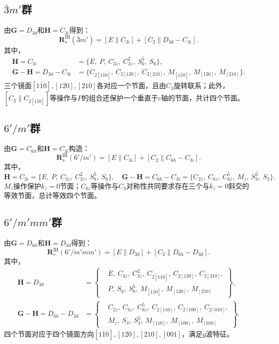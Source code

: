 \subsection*{$\bar{3}m'$群}
由$\mathbf{G}=D_{3d}$和$\mathbf{H}=C_{3i}$得到：
\[
\mathbf{R}_s^{\mathrm{III}}(\bar{3}m') = [E\|C_{3i}] + [C_2\|D_{3d}-C_{3i}].
\]
其中，
\[
\begin{aligned}
\mathbf{H}=C_{3i} &= \{E,\ P,\ C_{3z},\ C_{3z}^2,\ S_6^5,\ S_6\},\\
\mathbf{G}-\mathbf{H}=D_{3d}-C_{3i} &= \{C_{2[1\bar10]},\ C_{2[120]},\ C_{2[210]},\ M_{[1\bar10]},\ M_{[120]},\ M_{[210]}\}.
\end{aligned}
\]
三个镜面$[1\bar10],[120],[210]$各对应一个节面，且由$C_3$旋转联系；此外，$[C_2\|C_{2[1\bar10]}]$等操作与$P$的组合还保护一个垂直于$c$轴的节面，共计四个节面。

\subsection*{$6'/m'$群}
由$\mathbf{G}=C_{6h}$和$\mathbf{H}=C_{3i}$构造：
\[
\mathbf{R}_s^{\mathrm{III}}(6'/m') = [E\|C_{3i}] + [C_2\|C_{6h}-C_{3i}].
\]
其中，
\[
\mathbf{H}=C_{3i} = \{E,\ P,\ C_{3z},\ C_{3z}^2,\ S_6^5,\ S_6\},\quad
\mathbf{G}-\mathbf{H}=C_{6h}-C_{3i} = \{C_{2z},\ C_{6z},\ C_{6z}^5,\ M_z,\ S_3^5,\ S_3\}.
\]
$M_z$操作保护$k_z=0$节面；$C_{6z}$等操作与$C_3$对称性共同要求存在三个与$k_z=0$斜交的等效节面，总计等效四个节面。

\subsection*{$6'/m'mm'$群}
由$\mathbf{G}=D_{6h}$和$\mathbf{H}=D_{3d}$得到：
\[
\mathbf{R}_s^{\mathrm{III}}(6'/m'mm') = [E\|D_{3d}] + [C_2\|D_{6h}-D_{3d}].
\]
其中，
\[
\begin{aligned}
\mathbf{H}=D_{3d} &= \left\{
\begin{aligned}
&E,\ C_{3z},\ C_{3z}^2,\ C_{2[1\bar10]},\ C_{2[120]},\ C_{2[210]},\\
&P,\ S_6,\ S_6^5,\ M_{[1\bar10]},\ M_{[120]},\ M_{[210]}
\end{aligned}
\right\},\\
\mathbf{G}-\mathbf{H}=D_{6h}-D_{3d} &= \left\{
\begin{aligned}
&C_{2z},\ C_{6z},\ C_{6z}^5,\ C_{2[110]},\ C_{2[100]},\ C_{2[010]},\\
&M_z,\ S_3,\ S_3^5,\ M_{[110]},\ M_{[100]},\ M_{[010]}
\end{aligned}
\right\}.
\end{aligned}
\]
四个节面对应于四个镜面方向$[1\bar10],[120],[210],[001]$，满足$g$波特征。

